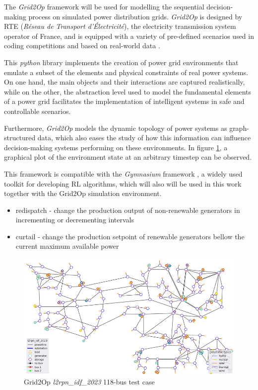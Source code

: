 The \textit{Grid2Op} framework \cite{rtefranceGrid2OpDocumentation} will be used for modelling the sequential decision-making process on simulated power distribution grids. \textit{Grid2Op} is designed by RTE (\textit{Réseau de Transport d'Électricité}), the electricity transmission system operator of France, and is equipped with a variety of pre-defined scenarios used in coding competitions and based on real-world data \cite{rtefranceGrid2OpDocumentation}. \par
This \textit{python} library implements the creation of power grid environments that emulate a subset of the elements and physical constraints of real power systems. On one hand, the main objects and their interactions are captured realistically, while on the other, the abstraction level used to model the fundamental elements of a power grid facilitates the implementation of intelligent systems in safe and controllable scenarios. \par
Furthermore, \textit{Grid2Op} models the dynamic topology of power systems as graph-structured data, which also eases the study of how this information can influence decision-making systems performing on these environments.  In figure \ref{fig:grid2op-graph}, a graphical plot of the environment state at an arbitrary timestep can be observed. \par
This framework is compatible with the \textit{Gymnasium} framework \cite{faramafoundationGymnasiumDocumentation}, a widely used toolkit for developing \ac{RL} algorithms, which will also will be used in this work together with the Grid2Op simulation environment. 

\begin{itemize}
	\item redispatch - change the production output of non-renewable generators in incrementing or decrementing intervals 
	\item curtail - change the production setpoint of renewable generators bellow the current maximum available power \cite{rtefranceGrid2OpDocumentation}
\end{itemize}



\begin{figure}
	\centering
	\includegraphics[width=0.85\linewidth]{./figures/grid2op-graph.png}
	\caption{Grid2Op \textit{l2rpn\_idf\_2023} 118-bus test case \cite{rtefranceGrid2OpDocumentation}}
	\label{fig:grid2op-graph}
\end{figure}



